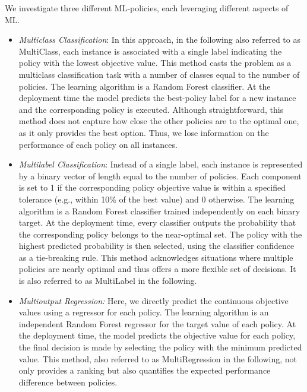 \documentclass[authoryear,preprint,12pt]{elsarticle}
\begin{document}
We investigate three different ML-policies, each leveraging different aspects of ML.

\begin{itemize}
    \item \textit{Multiclass Classification}: 
    In this approach, in the following also referred to as MultiClass, each instance is associated with a single label indicating the policy with the lowest objective value. This method casts the problem as a multiclass classification task with a number of classes equal to the number of policies. The learning algorithm is a Random Forest classifier. At the deployment time the model predicts the best-policy label for a new instance and the corresponding policy is executed. Although straightforward, this method does not capture how close the other policies are to the optimal one, as it only provides the best option. Thus, we lose information on the performance of each policy on all instances.

    \item \textit{Multilabel Classification}:
    Instead of a single label, each instance is represented by a binary vector of length equal to the number of policies. Each component is set to 1 if the corresponding policy objective value is within a specified tolerance (e.g., within 10\% of the best value) and 0 otherwise. The learning algorithm is a Random Forest classifier trained independently on each binary target. At the deployment time, every classifier outputs the probability that the corresponding policy belongs to the near-optimal set. The policy with the highest predicted probability is then selected, using the classifier confidence as a tie-breaking rule. This method acknowledges situations where multiple policies are nearly optimal and thus offers a more flexible set of decisions. It is also referred to as MultiLabel in the following.

    \item \textit{Multioutput Regression:}
    Here, we directly predict the continuous objective values using a regressor for each policy. The learning algorithm is an independent Random Forest regressor for the target value of each policy. At the deployment time, the model predicts the objective value for each policy, the final decision is made by selecting the policy with the minimum predicted value. This method, also referred to as MultiRegression in the following, not only provides a ranking but also quantifies the expected performance difference between policies. 
    
    

\end{itemize}
\end{document}
